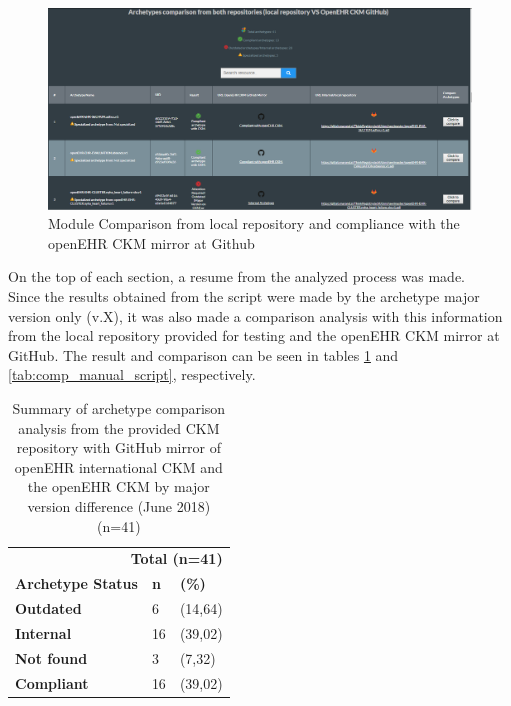 \documentclass[mim_thesis.tex]{subfiles}
\begin{document}
\begin{figure}[H]
	\centering
    \includegraphics[width=1\textwidth]{img/arch_comparison.PNG}
	\caption{Module Comparison from local repository and compliance with the openEHR CKM mirror at Github}
	\label{fig:arch_comparison}
\end{figure}

On the top of each section, a resume from the analyzed process was made.\\ 

Since the results obtained from the script were made by the archetype major version only (v.X), it was also made a comparison analysis with this information from the local repository provided for testing and the openEHR CKM mirror at GitHub. The result and comparison can be seen in tables \ref{tab:repos_comp_mv} and \ref{tab:comp_manual_script}, respectively.

\begin{table}[H]
	\centering
	\caption{Summary of archetype comparison analysis from the provided CKM repository with GitHub mirror of openEHR international CKM and the openEHR CKM by major version difference (June 2018) (n=41)}
	\label{tab:repos_comp_mv}
	\begin{tabular}{lll}
		\toprule[2pt]
		\multicolumn{3}{r}{\textbf{ Total (n=41) }} \\
		\cmidrule(r){2-3}
		\textbf{Archetype Status}   & \textbf{n} & \textbf{(\%)} \\
		\midrule[2pt]
		\textbf{Outdated } & 6 & (14,64) \\
		\midrule
		\textbf{Internal } & 16 & (39,02) \\
		\midrule
		\textbf{Not found } & 3 & (7,32) \\
        \midrule
		\textbf{Compliant } & 16 & (39,02) \\
		\bottomrule[2pt]
	\end{tabular}
\end{table}
\end{document}

